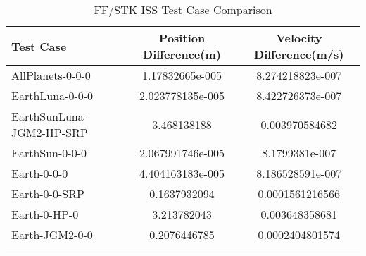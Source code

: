 \begin{table}[htbp!]
\centering
\caption{ FF/STK ISS Test Case Comparison}
      \begin{tabular}{lcc}
      \hline\hline
          Test Case & Position Difference(m) & Velocity Difference(m/s) \\
         \hline
         AllPlanets-0-0-0 & 1.17832665e-005 & 8.274218823e-007 \\
         EarthLuna-0-0-0 & 2.023778135e-005 & 8.422726373e-007 \\
         EarthSunLuna-JGM2-HP-SRP & 3.468138188 & 0.003970584682 \\
         EarthSun-0-0-0 & 2.067991746e-005 & 8.1799381e-007 \\
         Earth-0-0-0 & 4.404163183e-005 & 8.186528591e-007 \\
         Earth-0-0-SRP & 0.1637932094 & 0.0001561216566 \\
         Earth-0-HP-0 & 3.213782043 & 0.003648358681 \\
         Earth-JGM2-0-0 & 0.2076446785 & 0.0002404801574 \\
      \hline\hline
      \label{Table: ISS FF-STK Table} 
\end{tabular}
\end{table}
